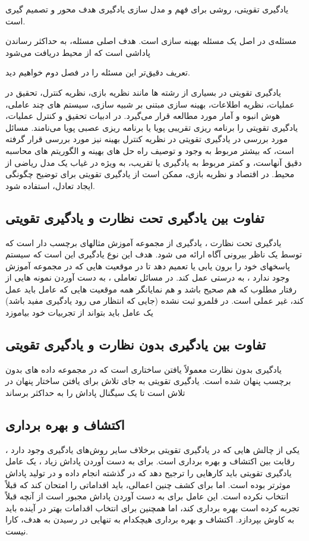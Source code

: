 یادگیری تقویتی، روشی برای فهم و مدل سازی یادگیری هدف محور و تصمیم گیری است.



مسئله‌ی  در اصل یک مسئله بهینه سازی است. هدف اصلی مسئله، به حداکثر رساندن پاداشی است که از محیط دریافت می‌شود

تعریف دقیق‌تر این مسئله را در فصل دوم خواهیم دید.

یادگیری تقویتی
در بسیاری از رشته ها مانند نظریه بازی، نظریه کنترل، تحقیق در عملیات، نظریه اطلاعات، بهینه سازی مبتنی بر شبیه سازی، سیستم های چند عاملی، هوش انبوه و آمار مورد مطالعه قرار می‌گیرد. در ادبیات تحقیق و کنترل عملیات، یادگیری تقویتی را برنامه ریزی تقریبی پویا   یا برنامه ریزی عصبی پویا   می‌نامند. مسائل مورد بررسی در یادگیری تقویتی در نظریه کنترل بهینه  نیز مورد بررسی قرار گرفته است، که بیشتر مربوط به وجود و توصیف راه حل های بهینه و الگوریتم های محاسبه دقیق آنهاست، و کمتر مربوط به یادگیری یا تقریب، به ویژه در غیاب یک مدل ریاضی از محیط. در اقتصاد و نظریه بازی، ممکن است از یادگیری تقویتی برای توضیح چگونگی ایجاد تعادل، استفاده شود.


\subsection{تفاوت بین یادگیری تحت نظارت و یادگیری تقویتی}
یادگیری تحت نظارت ، یادگیری از مجموعه آموزش مثالهای برچسب دار است که توسط یک ناظر بیرونی آگاه ارائه می شود. هدف این نوع یادگیری این است که سیستم پاسخهای خود را برون یابی یا تعمیم دهد تا در موقعیت هایی که در مجموعه آموزش وجود ندارد ، به درستی عمل کند. در مسائل تعاملی ، به دست آوردن نمونه هایی از رفتار مطلوب که هم صحیح باشد و هم نمایانگر همه موقعیت هایی که عامل باید عمل کند، غیر عملی است. در قلمرو ثبت نشده (جایی که انتظار می رود یادگیری مفید باشد) یک عامل باید بتواند از تجربیات خود بیاموزد

\subsection{تفاوت بین یادگیری بدون نظارت و یادگیری تقویتی}
یادگیری بدون نظارت معمولاً یافتن ساختاری است که در مجموعه داده های بدون برچسب پنهان شده است. یادگیری تقویتی به جای تلاش برای یافتن ساختار پنهان در تلاش است تا یک سیگنال پاداش را به حداکثر برساند

\subsection{اکتشاف و بهره برداری}
یکی از چالش هایی که در یادگیری تقویتی برخلاف سایر روش‌های یادگیری وجود دارد ، رقابت بین اکتشاف و بهره برداری است. برای به دست آوردن پاداش زیاد ، یک عامل یادگیری تقویتی باید کارهایی را ترجیح دهد که در گذشته انجام داده و در تولید پاداش موثرتر بوده است. اما برای کشف چنین اعمالی، باید اقداماتی را امتحان کند که قبلاً انتخاب نکرده است. این عامل برای به دست آوردن پاداش مجبور است از آنچه قبلاً تجربه کرده است بهره برداری کند، اما همچنین برای انتخاب اقدامات بهتر در آینده باید به کاوش بپردازد. 
اکتشاف و بهره برداری هیچکدام به تنهایی در رسیدن به هدف، کارا نیست.
